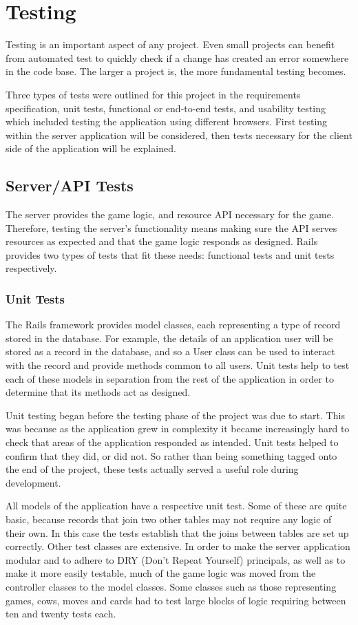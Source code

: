 \chapter{Testing}

Testing is an important aspect of any project. Even small projects can benefit from automated test to quickly check if a change has created an error somewhere in the code base. The larger a project is, the more fundamental testing becomes.

Three types of tests were outlined for this project in the requirements specification, unit tests, functional or end-to-end tests, and usability testing which included testing the application using different browsers. First testing within the server application will be considered, then tests necessary for the client side of the application will be explained.

\section{Server/API Tests}
The server provides the game logic, and resource API necessary for the game. Therefore, testing the server's functionality means making sure the API serves resources as expected and that the game logic responds as designed. Rails provides two types of tests that fit these needs: functional tests and unit tests respectively.

\subsection{Unit Tests}
The Rails framework provides model classes, each representing a type of record stored in the database. For example, the details of an application user will be stored as a record in the database, and so a User class  can be used to interact with the record and provide methods common to all users. Unit tests help to test each of these models in separation from the rest of the application in order to determine that its methods act as designed.

Unit testing began before the testing phase of the project was due to start. This was because as the application grew in complexity it became increasingly hard to check that areas of the application responded as intended. Unit tests helped to confirm that they did, or did not. So rather than being something tagged onto the end of the project, these tests actually served a useful role during development.

All models of the application have a respective unit test. Some of these are quite basic, because records that join two other tables may not require any logic of their own. In this case the tests establish that the joins between tables are set up correctly. Other test classes are extensive. In order to make the server application modular and to adhere to DRY (Don't Repeat Yourself) principals, as well as to make it more easily testable, much of the game logic was moved from the controller classes to the model classes. Some classes such as those representing games, cows, moves and cards had to test large blocks of logic requiring between ten and twenty tests each.
	
